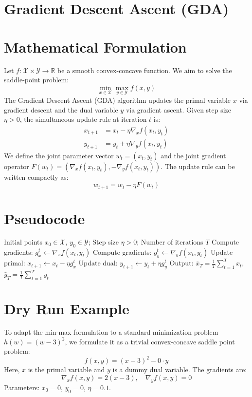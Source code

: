 \documentclass{article}
\begin{document}
\section*{Gradient Descent Ascent (GDA)}

\section*{Mathematical Formulation}
Let $f: \mathcal{X} \times \mathcal{Y} \to \mathbb{R}$ be a smooth convex-concave function. We aim to solve the saddle-point problem:
$$ \min_{x \in \mathcal{X}} \max_{y \in \mathcal{Y}} f(x, y) $$
The Gradient Descent Ascent (GDA) algorithm updates the primal variable $x$ via gradient descent and the dual variable $y$ via gradient ascent. Given step size $\eta > 0$, the simultaneous update rule at iteration $t$ is:
\begin{align*}
x_{t+1} &= x_t - \eta \nabla_x f(x_t, y_t) \\
y_{t+1} &= y_t + \eta \nabla_y f(x_t, y_t)
\end{align*}
We define the joint parameter vector $w_t = (x_t, y_t)$ and the joint gradient operator $F(w_t) = (\nabla_x f(x_t, y_t), -\nabla_y f(x_t, y_t))$. The update rule can be written compactly as:
$$ w_{t+1} = w_t - \eta F(w_t) $$

\section*{Pseudocode}
\begin{algorithm}[H]
\caption{Gradient Descent Ascent (GDA)}
\begin{algorithmic}[1]
\REQUIRE Initial points $x_0 \in \mathcal{X}$, $y_0 \in \mathcal{Y}$; Step size $\eta > 0$; Number of iterations $T$
    \STATE Compute gradients: $g_x^t \gets \nabla_x f(x_t, y_t)$
    \STATE Compute gradients: $g_y^t \gets \nabla_y f(x_t, y_t)$
    \STATE Update primal: $x_{t+1} \gets x_t - \eta g_x^t$
    \STATE Update dual: $y_{t+1} \gets y_t + \eta g_y^t$
\ENDFOR
\STATE Output: $\bar{x}_T = \frac{1}{T} \sum_{t=1}^T x_t$, $\bar{y}_T = \frac{1}{T} \sum_{t=1}^T y_t$
\end{algorithmic}
\end{algorithm}

\section*{Dry Run Example}
To adapt the min-max formulation to a standard minimization problem $h(w) = (w-3)^2$, we formulate it as a trivial convex-concave saddle point problem:
$$ f(x,y) = (x-3)^2 - 0 \cdot y $$
Here, $x$ is the primal variable and $y$ is a dummy dual variable. The gradients are:
$$ \nabla_x f(x,y) = 2(x-3), \quad \nabla_y f(x,y) = 0 $$
Parameters: $x_0 = 0$, $y_0 = 0$, $\eta = 0.1$.
\end{document}
